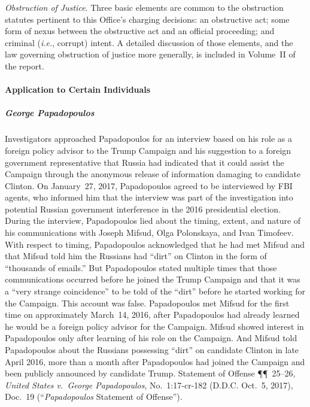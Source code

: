 \textit{Obstruction of Justice}.
Three basic elements are common to the obstruction statutes pertinent to this Office's charging decisions: an obstructive act; some form of nexus between the obstructive act and an official proceeding; and criminal (\textit{i.e.}, corrupt) intent.
A detailed discussion of those elements, and the law governing obstruction of justice more generally, is included in Volume~II of the report.

\paragraph{Application to Certain Individuals}

\subparagraph{George Papadopoulos}
Investigators approached Papadopoulos for an interview based on his role as a foreign policy advisor to the Trump Campaign and his suggestion to a foreign government representative that Russia had indicated that it could assist the Campaign through the anonymous release of information damaging to candidate Clinton.
On January~27, 2017, Papadopoulos agreed to be interviewed by FBI agents, who informed him that the interview was part of the investigation into potential Russian government interference in the 2016 presidential election.
During the interview, Papadopoulos lied about the timing, extent, and nature of his communications with Joseph Mifsud, Olga Polonskaya, and Ivan Timofeev.
With respect to timing, Papadopoulos acknowledged that he had met Mifsud and that Mifsud told him the Russians had ``dirt'' on Clinton in the form of ``thousands of emails.''
But Papadopoulos stated multiple times that those communications occurred before he joined the Trump Campaign and that it was a ``very strange coincidence'' to be told of the ``dirt'' before he started working for the Campaign.
This account was false.
Papadopoulos met Mifsud for the first time on approximately March~14, 2016, after Papadopoulos had already learned he would be a foreign policy advisor for the Campaign.
Mifsud showed interest in Papadopoulos only after learning of his role on the Campaign.
And Mifsud told Papadopoulos about the Russians possessing ``dirt'' on candidate Clinton in late April 2016, more than a month after Papadopoulos had joined the Campaign and been publicly announced by candidate Trump.
Statement of Offense \P\P~25--26, \textit{United States v.\ George Papadopoulos}, No.~1:17-cr-182 (D.D.C. Oct.~5, 2017), Doc.~19 (``\textit{Papadopoulos} Statement of Offense'').

